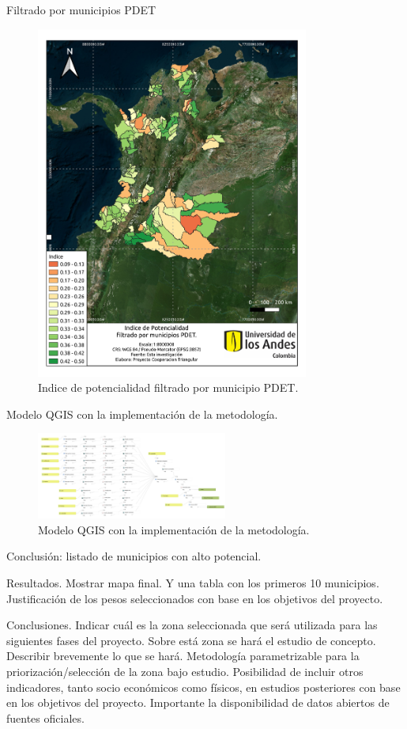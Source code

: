 Filtrado por municipios PDET
\begin{figure}
    \centering
    \includegraphics[width=0.8\textwidth]{figures/porpdet}
    \caption{Indice de potencialidad filtrado por municipio PDET.}
    \label{fig:porpdet}
\end{figure}

Modelo QGIS con la implementación de la metodología.
\begin{figure}
    \centering
    \includegraphics[angle=90, width=0.56\textwidth]{figures/modelo}
    \caption{Modelo QGIS con la implementación de la metodología.}
    \label{fig:modelo}
\end{figure}

Conclusión: listado de municipios con alto potencial.

Resultados.
Mostrar mapa final. Y una tabla con los primeros 10 municipios. Justificación de los pesos seleccionados con base en los objetivos del proyecto.

Conclusiones.
Indicar cuál es la zona seleccionada que será utilizada para las siguientes fases del proyecto. Sobre está zona se hará el estudio de concepto. Describir
brevemente lo que se hará.
Metodología parametrizable para la priorización/selección de la zona bajo estudio.
Posibilidad de incluir otros indicadores, tanto socio económicos como físicos, en estudios posteriores con base en los objetivos del proyecto.
Importante la disponibilidad de datos abiertos de fuentes oficiales.
